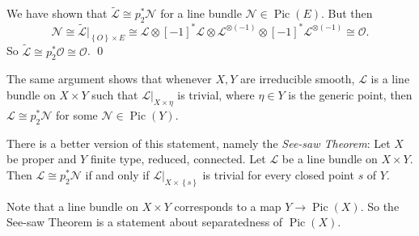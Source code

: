 We have shown that \( \widetilde{\mathcal{L}} \cong p_2^* \mathcal{N} \) for a line bundle \( \mathcal{N} \in \operatorname{Pic}(E) \). But then
\[ \mathcal{N} \cong \widetilde{\mathcal{L}}|_{\left\lbrace O \right\rbrace \times E} \cong \mathcal{L} \otimes [-1]^* \mathcal{L} \otimes \mathcal{L}^{\otimes (-1)} \otimes [-1]^* \mathcal{L}^{\otimes (-1)} \cong \mathcal{O} . \]
So \( \widetilde{\mathcal{L}} \cong p_2^* \mathcal{O} \cong \mathcal{O} \). \qed

\begin{remark}
  The same argument shows that whenever \( X,Y \) are irreducible smooth, \( \mathcal{L} \) is a line bundle on \( X \times Y \) such that \( \mathcal{L}|_{X \times \eta} \) is trivial, where \( \eta \in Y \) is the generic point, then \( \mathcal{L} \cong p_2^* \mathcal{N} \) for some \( \mathcal{N} \in \operatorname{Pic}(Y) \).

  There is a better version of this statement, namely the \textit{See-saw Theorem}: Let \( X \) be proper and \( Y \) finite type, reduced, connected.
  Let \( \mathcal{L} \) be a line bundle on \( X \times Y \). Then \( \mathcal{L} \cong p_2^* \mathcal{N} \) if and only if \( \mathcal{L}|_{X \times \left\lbrace s \right\rbrace} \) is trivial for every closed point \( s \) of \( Y \).

    Note that a line bundle on \( X \times Y \) corresponds to a map \( Y \to \operatorname{Pic}(X) \). So the See-saw Theorem is a statement about separatedness of \( \operatorname{Pic}(X) \).
\end{remark}

